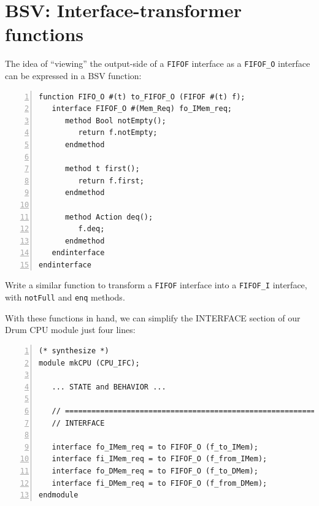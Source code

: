 
\section{BSV: Interface-transformer functions}


The idea of ``viewing'' the output-side of a \verb|FIFOF| interface as
a \verb|FIFOF_O| interface can be expressed in a BSV function:

\begin{Verbatim}[frame=single, numbers=left]
function FIFO_O #(t) to_FIFOF_O (FIFOF #(t) f);
   interface FIFOF_O #(Mem_Req) fo_IMem_req;
      method Bool notEmpty();
         return f.notEmpty;
      endmethod

      method t first();
         return f.first;
      endmethod

      method Action deq();
         f.deq;
      endmethod
   endinterface
endinterface
\end{Verbatim}


\hdivider

\Exercise

Write a similar function to transform a \verb|FIFOF| interface into a
\verb|FIFOF_I| interface, with \verb|notFull| and \verb|enq| methods.

\Endexercise

With these functions in hand, we can simplify the INTERFACE section of
our Drum CPU module just four lines:


\begin{Verbatim}[frame=single, numbers=left]
(* synthesize *)
module mkCPU (CPU_IFC);

   ... STATE and BEHAVIOR ...

   // ================================================================
   // INTERFACE

   interface fo_IMem_req = to FIFOF_O (f_to_IMem);
   interface fi_IMem_req = to FIFOF_O (f_from_IMem);
   interface fo_DMem_req = to FIFOF_O (f_to_DMem);
   interface fi_DMem_req = to FIFOF_O (f_from_DMem);
endmodule
\end{Verbatim}

